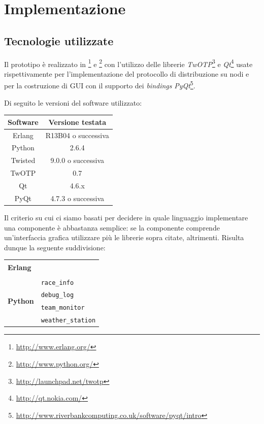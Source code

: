 \chapter{Implementazione}
\label{ch:implementazione}

\section{Tecnologie utilizzate}
Il prototipo è realizzato in \Erlang{}\footnote{\url{http://www.erlang.org/}} e \Python{}\footnote{\url{http://www.python.org/}} con l'utilizzo delle librerie \textsl{TwOTP}\footnote{\url{http://launchpad.net/twotp}} e \textsl{Qt}\footnote{\url{http://qt.nokia.com/}} usate rispettivamente per l'implementazione del protocollo di distribuzione \Erlang{} su nodi \Python{} e per la costruzione di GUI con il supporto dei \textit{bindings} \textsl{PyQt}\footnote{\url{http://www.riverbankcomputing.co.uk/software/pyqt/intro}}.

Di seguito le versioni del software utilizzato:
\begin{center}
\begin{tabular}{c|c}
\textbf{Software} & \textbf{Versione testata} \\
\hline
Erlang & R13B04 o successiva \\
\hline
Python & 2.6.4 \\
\hline
Twisted & 9.0.0 o successiva \\
TwOTP & 0.7 \\
\hline
Qt & 4.6.x \\
PyQt & 4.7.3 o successiva \\
\end{tabular}
\end{center}

Il criterio su cui ci siamo basati per decidere in quale linguaggio implementare una componente è abbastanza semplice: se la componente comprende un'interfaccia grafica utilizzare \Python{} più le librerie sopra citate, \Erlang{} altrimenti. Risulta dunque la seguente suddivisione:
\begin{center}
\begin{tabular}{|p{}|p{}|}
\hline
\multirow{6}{*}{\textbf{Erlang}} & \sched{}\\
& \evdisp{}\\
& \track{}\\
& \team{}\\
& \car{}\\
& \weather{}\\
\hline
\multirow{4}{*}{\textbf{Python}} & \texttt{race\_info}\\
& \texttt{debug\_log}\\
& \texttt{team\_monitor}\\
& \texttt{weather\_station}\\
\hline
\end{tabular}
\end{center}

